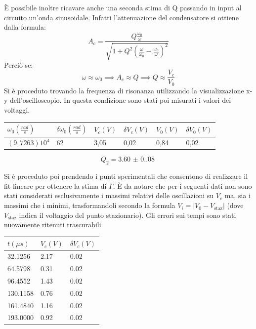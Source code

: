 \documentclass[12pt, a4paper]{article}
\newcommand{\E}{\`E } %
\begin{document}
\E possibile inoltre ricavare anche una seconda stima di Q passando in input al circuito un'onda sinusoidale.
Infatti l'attenuazione del condensatore si ottiene dalla formula: 
\[A_c=\frac{Q\frac{\omega_0}{\omega}}{\sqrt{1+Q^2(\frac{\omega}{\omega_0}-\frac{\omega_0}{\omega})^2}}\] 
Perciò se: \[\omega \approx \omega_0 \implies A_c \approx Q \implies Q\approx \frac{V_c}{V_0}\]
Si è proceduto trovando la frequenza di risonanza utilizzando la visualizzazione x-y dell'oscilloscopio. In questa
condizione sono stati poi misurati i valori dei voltaggi. 

\begin{table}[H]
\centering
\begin{tabular}{@{}llllll@{}}
\toprule
\(\omega_0(\frac{rad}{s})\)  & \(\delta \omega_0(\frac{rad}{s})\)  & \(V_c(V)\) & \(\delta V_c(V)\) & \(V_0(V)\) & \(\delta V_0(V)\) \\ \midrule
\((9,7263)10^4\) & 62 & 3,05   & 0,02    & 0,84  & 0,02    \\ \bottomrule
\end{tabular}
\end{table}

\[Q_2=\qty{3.60(0.08)}{}\]


Si è proceduto poi prendendo i punti sperimentali che consentono di realizzare il fit lineare per ottenere la stima di \(\Gamma\).
\E da notare che per i seguenti dati non sono stati considerati esclusivamente i massimi relativi delle oscillazioni su \(V_c\) ma, sia i massimi che i minimi, trasformandoli secondo
la formula \(V_i = \left\lvert V_0 - V_\text{staz}\right\rvert\) (dove \(V_\text{staz}\) indica il voltaggio del punto stazionario). Gli errori sui tempi sono 
stati nuovamente ritenuti trascurabili.

\begin{table}[H]
\centering
\begin{tabular}{@{}lll@{}}
\toprule
\(t(\mu s)\)  & \(V_c(V)\) & \(\delta V_c(V)\) \\ \midrule
32.1256   & 2.17  & 0.02   \\
64.5798   & 0.31  & 0.02   \\
96.4552   & 1.43  & 0.02   \\
130.1158  & 0.76  & 0.02   \\
161.4840  & 1.16  & 0.02   \\
193.0000  & 0.92  & 0.02   \\ \bottomrule
\end{tabular}
\end{table}
\end{document}
